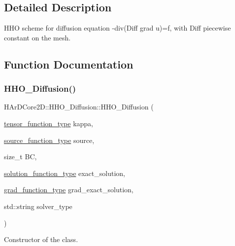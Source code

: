 \subsection{Detailed Description}
H\+HO scheme for diffusion equation -\/div(Diff grad u)=f, with Diff piecewise constant on the mesh. 



\subsection{Function Documentation}
\mbox{\label{group__HHO__Diffusion_ga9ab2e2cdf0c77f60069f7572c587c4f1}} 
\subsubsection{\texorpdfstring{H\+H\+O\+\_\+\+Diffusion()}{HHO\_Diffusion()}}
{\footnotesize\ttfamily H\+Ar\+D\+Core2\+D\+::\+H\+H\+O\+\_\+\+Diffusion\+::\+H\+H\+O\+\_\+\+Diffusion (\begin{DoxyParamCaption}\item[{\hyperlink{classHArDCore2D_1_1HHO__Diffusion_acc4abb92b452d6407d45a87823fb47f9}{tensor\+\_\+function\+\_\+type}}]{kappa,  }\item[{\hyperlink{classHArDCore2D_1_1HHO__Diffusion_ade095df766ff04bf09385a163136e5c0}{source\+\_\+function\+\_\+type}}]{source,  }\item[{size\+\_\+t}]{BC,  }\item[{\hyperlink{classHArDCore2D_1_1HHO__Diffusion_ac2ddc18a37be70e4767a9040fb6a09f6}{solution\+\_\+function\+\_\+type}}]{exact\+\_\+solution,  }\item[{\hyperlink{classHArDCore2D_1_1HHO__Diffusion_a14797a72cc96ee5ea6fc45e4986d6a84}{grad\+\_\+function\+\_\+type}}]{grad\+\_\+exact\+\_\+solution,  }\item[{std\+::string}]{solver\+\_\+type }\end{DoxyParamCaption})}



Constructor of the class. 


